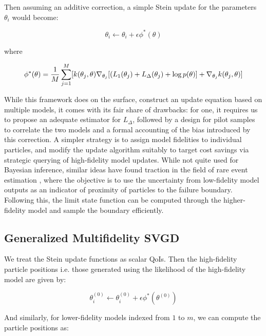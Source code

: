 \documentclass[12pt]{article}
\renewcommand{\[}{\left[}
\renewcommand{\]}{\right]}
\renewcommand{\(}{\left(}
\renewcommand{\)}{\right)}
\newcommand{\grad}[1]{\nabla #1}
\begin{document}
Then assuming an additive correction, a simple Stein update for the parameters $\theta_i$ would become:

\begin{equation}
    \theta_i \leftarrow \theta_i + \epsilon \phi^{\ast}(\theta)
\end{equation}

where 

\begin{equation}
    \phi^{\ast}(\theta) = \frac{1}{M}\sum_{j=1}^{M}[k(\theta_j, \theta) \grad_{\theta_j}[(L_{1}(\theta_j) + L_{\Delta}(\theta_j) + \log p(\theta)] + \grad_{\theta_j} k(\theta_j, \theta)]
\end{equation}

While this framework does on the surface, construct an update equation based on multiple models, it comes with its fair share of drawbacks: for one, it requires us to propose an adequate estimator for $L_{\Delta}$, followed by a design for pilot samples to correlate the two models and a formal accounting of the bias introduced by this correction. 
A simpler strategy is to assign model fidelities to individual particles, and modify the update algorithm suitably to target cost savings via strategic querying of high-fidelity model updates. While not quite used for Bayesian inference, similar ideas have found traction in the field of rare event estimation \cite{dhulipala_bayesian_2022}, where the objective is to use the uncertainty from low-fidelity model outputs as an indicator of proximity of particles to the failure boundary. Following this, the limit state function can be computed through the higher-fidelity model and sample the boundary efficiently.

\subsection{Generalized Multifidelity SVGD}

We treat the Stein update functions as scalar QoIs. Then the high-fidelity particle positions i.e. those generated using the likelihood of the high-fidelity model are given by:

\begin{equation*}
    \theta^{(0)}_i \leftarrow \theta^{(0)}_i + \epsilon \phi^{\ast}(\theta^{(0)})
\end{equation*}

And similarly, for lower-fidelity models indexed from $1$ to $m$, we can compute the particle positions as:
\end{document}
